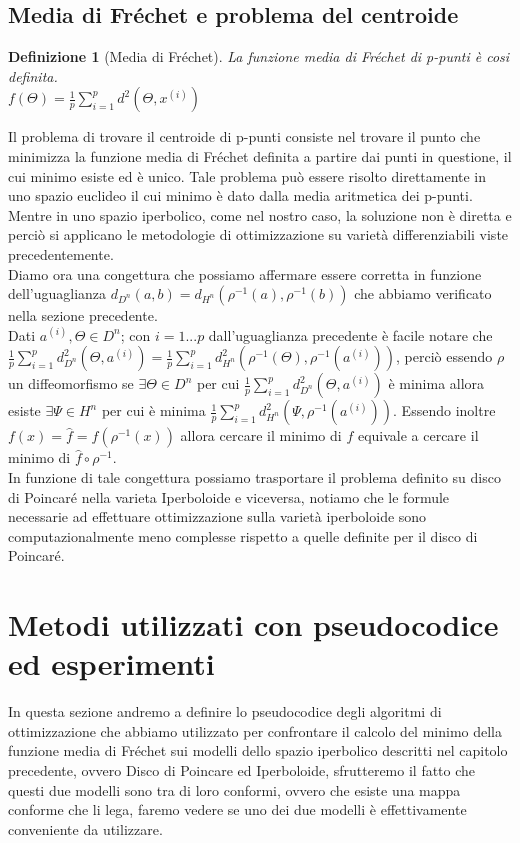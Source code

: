 \documentclass[a4paper, 12pt]{article}
\newtheorem{definition}{Definizione}
\begin{document}
\subsection{Media di Fréchet e problema del centroide}
\begin{definition}[Media di Fréchet]
La funzione media di Fréchet di p-punti è cosi definita.\\
$f(\Theta) = \frac{1}{p}\sum_{i=1}^p d^2(\Theta, x^{(i)})$
\end{definition}
Il problema di trovare il centroide di p-punti consiste nel trovare il punto che minimizza la funzione media di Fréchet definita a partire dai punti in questione, il cui minimo esiste ed è unico. Tale problema può essere risolto direttamente in uno spazio euclideo il cui minimo è dato dalla media aritmetica dei p-punti. Mentre in uno spazio iperbolico, come nel nostro caso, la soluzione non è diretta e perciò si applicano le metodologie di ottimizzazione su varietà differenziabili viste precedentemente.\\
Diamo ora una congettura che possiamo affermare essere corretta in funzione dell'uguaglianza $d_{D^n}(a, b) = d_{H^n}(\rho^{-1}(a), \rho^{-1}(b))$ che abbiamo verificato nella sezione precedente.\\
Dati $a^{(i)}, \Theta \in D^n$; con $i = 1...p$ dall'uguaglianza precedente è facile notare che $\frac{1}{p}\sum_{i=1}^p d_{D^n}^2(\Theta, a^{(i)}) = \frac{1}{p}\sum_{i=1}^p d_{H^n}^2(\rho^{-1}(\Theta), \rho^{-1}(a^{(i)}))$, perciò essendo $\rho$ un diffeomorfismo se $\exists \Theta \in D^n$ per cui $\frac{1}{p}\sum_{i=1}^p d_{D^n}^2(\Theta, a^{(i)})$ è minima allora esiste $\exists \Psi \in H^n$ per cui è minima $\frac{1}{p}\sum_{i=1}^p d_{H^n}^2(\Psi, \rho^{-1}(a^{(i)}))$. Essendo inoltre $f(x) = \hat{f} = f(\rho^{-1}(x))$ allora cercare il minimo di $f$ equivale a cercare il minimo di $\hat{f} \circ \rho^{-1}$.\\
In funzione di tale congettura possiamo trasportare il problema definito su disco di Poincaré nella varieta Iperboloide e viceversa, notiamo che le formule necessarie ad effettuare ottimizzazione sulla varietà iperboloide sono computazionalmente meno complesse rispetto a quelle definite per il disco di Poincaré.
\section{Metodi utilizzati con pseudocodice ed esperimenti}
In questa sezione andremo a definire lo pseudocodice degli algoritmi di ottimizzazione che abbiamo utilizzato per confrontare il calcolo del minimo della funzione media di Fréchet sui modelli dello spazio iperbolico descritti nel capitolo precedente, ovvero Disco di Poincare ed Iperboloide, sfrutteremo il fatto che questi due modelli sono tra di loro conformi, ovvero che esiste una mappa conforme che li lega, faremo vedere se uno dei due modelli è effettivamente conveniente da utilizzare.
\end{document}
